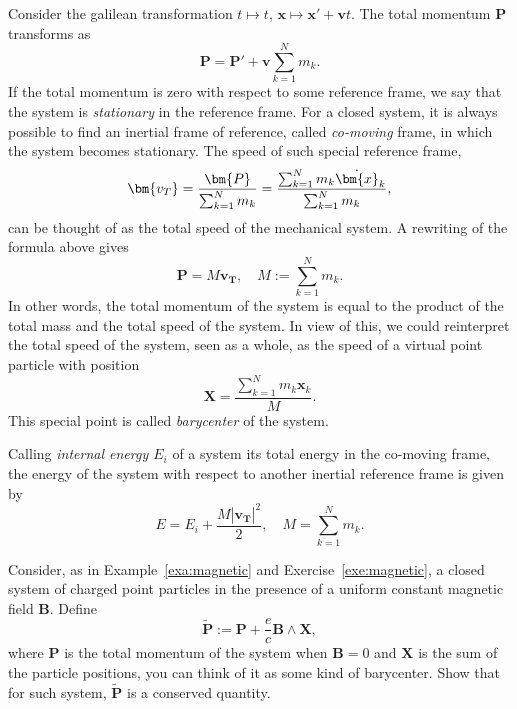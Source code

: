 \documentclass[english,fontsize=11pt,paper=a5,oneside]{scrbook}
\newcommand{\bx}{\bm{x}}
\theoremstyle{definition}
\newenvironment{example}
  {\pushQED{\qed}\renewcommand{\qedsymbol}{$\lozenge$}\examplex}
  {\popQED\endexamplex}
\newenvironment{exercise}
  {\pushQED{\qed}\renewcommand{\qedsymbol}{$\maltese$}\exercisex}
  {\popQED\endexercisex}
\begin{document}
\begin{example}[The baricenter]
  Consider the galilean transformation $t \mapsto t$, $\bx \mapsto \bx' + \bm{v}t$.
  The total momentum $\bm{P}$ transforms as
  \begin{equation}
    \bm{P} = \bm{P}' + \bm{v}  \sum_{k=1}^N m_k.
  \end{equation}
  If the total momentum is zero with respect to some reference frame, we say that the system is \emph{stationary} in the reference frame. For a closed system, it is always possible to find an inertial frame of reference, called \emph{co-moving} frame, in which the system becomes stationary. The speed of such special reference frame,
  \begin{equation}
    \bm{v_T} = \frac{\bm{P}}{\sum_{k=1}^N m_k}
    = \frac{\sum_{k=1}^N m_k \dot \bx_k}{\sum_{k=1}^N m_k},
  \end{equation}
  can be thought of as the total speed of the mechanical system.
  A rewriting of the formula above gives
  \begin{equation}
    \bm{P} = M \bm{v_T}, \quad M:= \sum_{k=1}^N m_k.
  \end{equation}
  In other words, the total momentum of the system is equal to the product of the total mass and the total speed of the system.
  In view of this, we could reinterpret the total speed of the system, seen as a whole, as the speed of a virtual point particle with position
  \begin{equation}
    \bm{X} = \frac{\sum_{k=1}^N m_k \bx_k}{M}.
  \end{equation}
  This special point is called \emph{barycenter} of the system.
  \medskip

  Calling \emph{internal energy $E_i$} of a system its total energy in the co-moving frame, the energy of the system with respect to another inertial reference frame is given by
  \begin{equation}
    E = E_i + \frac{M |\bm{v_T}|^2}{2}, \quad M= \sum_{k=1}^N m_k.
  \end{equation}
\end{example}

\begin{exercise}
  Consider, as in Example~\ref{exa:magnetic} and Exercise~\ref{exe:magnetic}, a closed system of charged point particles in the presence of a uniform constant magnetic field $\bm{B}$. Define
  \begin{equation}
    \widetilde{\bm{P}} := \bm{P} + \frac{e}c \bm{B}\wedge \bm{X},
  \end{equation}
  where $\bm{P}$ is the total momentum of the system when $\bm{B} = 0$ and $\bm{X}$ is the sum of the particle positions, you can think of it as some kind of barycenter.
  Show that for such system, $\widetilde{\bm{P}}$ is a conserved quantity.
\end{exercise}
\end{document}
